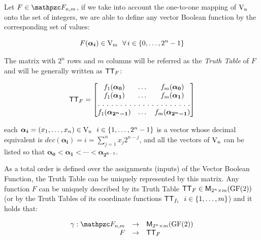 \begin{definition}\label{def:TruthTable}
Let $F \in \funct{F}_{n,m}$, if we take into account the one-to-one mapping of $\gf{V_n}$ onto the set of integers, we are able to define any vector Boolean function by the corresponding set of values:

\begin{equation}
    F(\boldsymbol{\alpha_i}) \in \gf{V_m} \  \  \fa i \in \{0,\dots,2^n-1\} 
\end{equation}

The matrix with $2^n$ rows and $m$ columns will be referred as the \textit{Truth Table} of $F$ and will be generally written as $\matr{TT}_F$:

\begin{equation}
    \matr{TT}_F=\begin{bmatrix} f_1(\boldsymbol{\alpha_0})&\dots&f_{m}(\boldsymbol{\alpha_0}) \\
f_1(\boldsymbol{\alpha_1})&\dots&f_{m}(\boldsymbol{\alpha_1}) \\
\hdotsfor[2]{3} \\
f_1(\boldsymbol{\alpha_{2^n-1}})&\dots&f_{m}(\boldsymbol{\alpha_{2^n-1}}) \end{bmatrix} 
\end{equation}

each $\boldsymbol{\alpha_i} = (x_1,\dots ,x_n) \in \gf{V_n} \  \  i \in
\{1,\dots,2^n-1\}$ is a vector whose decimal equivalent is
$dec(\boldsymbol{\alpha_i})=i=\sum_{j=1}^{n} x_j 2^{n-j}$, and all
the vectors of $\gf{V_n}$ can be listed so that $\boldsymbol{\alpha_0} <
\boldsymbol{\alpha_1} < \dotsb < \boldsymbol{\alpha_{2^{n-1}}}$. 
\end{definition}

As a total order is defined over the assignments (inputs) of the Vector Boolean Function, the Truth Table can be uniquely represented by this matrix. Any function $F$ can be uniquely described by its Truth Table $\matr{TT}_F \in \matr{M}_{2^n \times m}(\gf{GF(2)})$ (or by the Truth Tables of its coordinate functions $\matr{TT}_{f_i} \  \  i \in \{1,\dots,m\}$) and it holds that:

\begin{equation}
\begin{array}{rcl}
    \gamma:\funct{F}_{n,m} &\to& \matr{M}_{2^n \times m}(\gf{GF(2)}) \\
      F &\to& \matr{TT}_F 
\end{array}
\end{equation}

